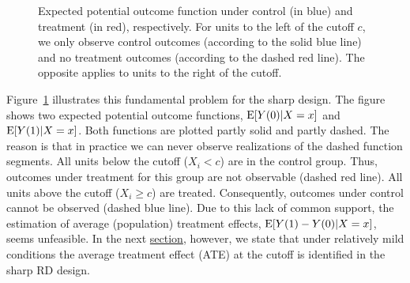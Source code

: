 \begin{figure}[p]
	\centering
	\caption{Expected potential outcome function under control (in blue) and treatment (in red), respectively.
			 For units to the left of the cutoff $c$, we only observe control outcomes (according to the solid blue line) and no treatment outcomes (according to the dashed red line).
		 	 The opposite applies to units to the right of the cutoff.}
	\label{fig:regression_functions_SRDD}
\end{figure}
\noindent
Figure~\ref{fig:regression_functions_SRDD} illustrates this fundamental problem for the sharp design.
The figure shows two expected potential outcome functions, $\operatorname{E}[Y(0) | X=x]$ and $\operatorname{E}[Y(1) | X=x]$.
Both functions are plotted partly solid and partly dashed.
The reason is that in practice we can never observe realizations of the dashed function segments.
All units below the cutoff ($X_i < c$) are in the control group.
Thus, outcomes under treatment for this group are not observable (dashed red line).
All units above the cutoff ($X_i \geq c$) are treated.
Consequently, outcomes under control cannot be observed (dashed blue line).
Due to this lack of common support, the estimation of average (population) treatment effects, $\operatorname{E}[Y(1) - Y(0) | X = x]$, seems unfeasible.
In the next \hyperref[sec:identification]{section}, however, we state that under relatively mild conditions the average treatment effect (ATE) at the cutoff is identified in the sharp RD design.

